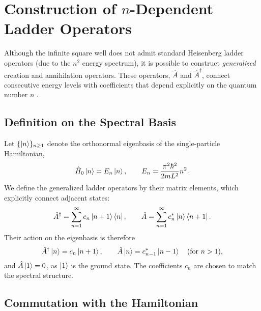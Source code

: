 \section{Construction of $n$-Dependent Ladder Operators}

Although the infinite square well does not admit standard Heisenberg
ladder operators (due to the $n^2$ energy spectrum), it is possible
to construct \emph{generalized} creation and annihilation operators.
These operators, $\hat{A}$ and $\hat{A}^\dagger$, connect
consecutive energy levels with coefficients that depend explicitly on
the quantum number $n$ \cite{CohenTanoudji2023, Jalali2013, Curado2001}.

\subsection{Definition on the Spectral Basis}

Let $\{\ket{n}\}_{n \ge 1}$ denote the orthonormal eigenbasis
of the single-particle Hamiltonian,
\begin{equation} \label{eq:H_eigenbasis}
  \hat{H}_0 \ket{n} = E_n \ket{n}, \qquad E_n =
  \frac{\pi^2\hbar^2}{2mL^2}n^2.
\end{equation}
We define the generalized ladder operators by their matrix elements,
which explicitly connect adjacent states:
\begin{equation}
  \hat{A}^\dagger = \sum_{n=1}^{\infty} c_n \ket{n+1}\bra{n}, \qquad
  \hat{A} = \sum_{n=1}^{\infty} c_n^* \ket{n}\bra{n+1}.
\end{equation}
Their action on the eigenbasis is therefore
\begin{equation}
  \hat{A}^\dagger \ket{n} = c_n \ket{n+1}, \qquad
  \hat{A} \ket{n} = c_{n-1}^* \ket{n-1} \quad (\text{for } n > 1),
\end{equation}
and $\hat{A}\ket{1} = 0$, as $\ket{1}$ is the ground state.
The coefficients $c_n$ are chosen to match the spectral structure.

\subsection{Commutation with the Hamiltonian}

